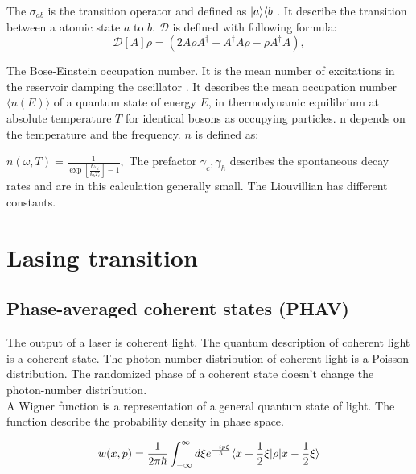 \documentclass[12pt,a4paper]{article}
\DeclarePairedDelimiter\bra{\langle}{\rvert}
\DeclarePairedDelimiter\ket{\lvert}{\rangle}
\begin{document}
The $\sigma_{ab} $ is the transition operator and defined as $ \ket{a}\bra{b}$. It describe the transition between a atomic state $a$ to $b$.
$\mathcal{D}$ is defined with following formula:
\begin{equation}
\mathcal{D}[A]\rho=(2A \rho	A^{\dag}-A^{\dag}A\rho-\rho A^{\dag}A),
\end{equation}

The Bose-Einstein occupation number. It is the mean number of excitations in the reservoir damping the oscillator  . It describes the mean occupation number $\langle n(E) \rangle$ of a quantum state of energy $E$, in thermodynamic equilibrium at absolute temperature $T $ for identical bosons as occupying particles. n depends on the temperature and the frequency.
$n$ is defined as:

$
n(\omega,T)=\frac{1}{\exp[\frac{\hbar \omega_i}{k_b T_i}]-1},
$
The  prefactor $\gamma_c ,\gamma_h$ describes the spontaneous decay rates and are in this calculation generally small.
The Liouvillian has different constants. 

\section{Lasing transition}

\subsection{Phase-averaged coherent states (PHAV)}
The output of a laser is coherent light.
The quantum description of coherent light is a coherent state. The photon number distribution of coherent light is a Poisson distribution. The randomized phase of a coherent state doesn't change the photon-number distribution. \\

A Wigner function is a representation of a general quantum state of light.
The function describe the probability density in phase space.

\begin{equation}
w(x,p)=\frac{1}{2\pi \hbar}\int_{- \infty}^{\infty} d\xi e^{\frac{-i p \xi}{\hbar}}\bra{x+\frac{1}{2}\xi}\rho\ket{x-\frac{1}{2}\xi}
\end{equation}
\end{document}
